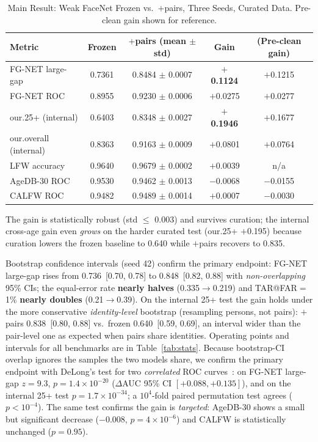 \documentclass[journal]{IEEEtran}
\begin{document}
\begin{table}[!t]
\renewcommand{\arraystretch}{1.2}
\caption{Main Result: Weak FaceNet Frozen vs.\ $+$pairs, Three Seeds, Curated Data. Pre-clean gain shown for reference.}
\label{tab:main}
\centering
\footnotesize
\begin{tabular}{@{}lcccc@{}}
\toprule
Metric & Frozen & $+$pairs (mean $\pm$ std) & Gain & (Pre-clean gain) \\
\midrule
FG-NET large-gap & 0.7361 & 0.8484 $\pm$ 0.0007 & \textbf{$+$0.1124} & $+$0.1215 \\
FG-NET ROC & 0.8955 & 0.9230 $\pm$ 0.0006 & $+$0.0275 & $+$0.0277 \\
our.25+ (internal) & 0.6403 & 0.8348 $\pm$ 0.0027 & \textbf{$+$0.1946} & $+$0.1677 \\
our.overall (internal) & 0.8363 & 0.9163 $\pm$ 0.0009 & $+$0.0801 & $+$0.0764 \\
LFW accuracy & 0.9640 & 0.9679 $\pm$ 0.0002 & $+$0.0039 & n/a \\
AgeDB-30 ROC & 0.9530 & 0.9462 $\pm$ 0.0013 & $-$0.0068 & $-$0.0155 \\
CALFW ROC & 0.9482 & 0.9489 $\pm$ 0.0014 & $+$0.0007 & $-$0.0030 \\
\bottomrule
\end{tabular}
\end{table}

The gain is statistically robust (std $\leq$ 0.003) and survives curation; the internal cross-age gain even \emph{grows} on the harder curated test (our.25+ $+$0.195) because curation lowers the frozen baseline to 0.640 while $+$pairs recovers to 0.835.

Bootstrap confidence intervals (seed 42) confirm the primary endpoint: FG-NET large-gap rises from 0.736~[0.70, 0.78] to 0.848~[0.82, 0.88] with \emph{non-overlapping} 95\% CIs; the equal-error rate \textbf{nearly halves} (0.335$\to$0.219) and TAR@FAR$=$1\% \textbf{nearly doubles} (0.21$\to$0.39). On the internal 25+ test the gain holds under the more conservative \emph{identity-level} bootstrap (resampling persons, not pairs): $+$pairs 0.838~[0.80, 0.88] vs.\ frozen 0.640~[0.59, 0.69], an interval wider than the pair-level one as expected when pairs share identities. Operating points and intervals for all benchmarks are in Table~\ref{tab:stats}. Because bootstrap-CI overlap ignores the samples the two models share, we confirm the primary endpoint with DeLong's test for two \emph{correlated} ROC curves~\cite{delong1988}: on FG-NET large-gap $z=9.3$, $p=1.4\times10^{-20}$ ($\Delta$AUC 95\% CI $[+0.088,+0.135]$), and on the internal 25+ test $p=1.7\times10^{-34}$; a $10^4$-fold paired permutation test agrees ($p<10^{-4}$). The same test confirms the gain is \emph{targeted}: AgeDB-30 shows a small but significant decrease ($-$0.008, $p=4\times10^{-6}$) and CALFW is statistically unchanged ($p=0.95$).
\end{document}
